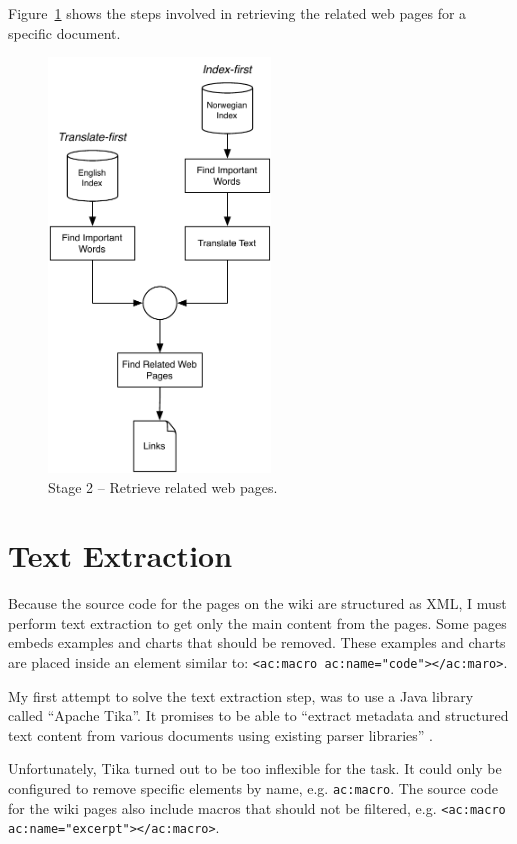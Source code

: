 \documentclass[a4paper]{book}
\begin{document}
Figure~\ref{fig:retrieveRelatedWebPages} shows the steps involved in retrieving the related web pages for a specific document.
\begin{figure}[H]
\centering
\includegraphics[height=11cm]{figs/stage2.pdf}
\caption{Stage 2 -- Retrieve related web pages.}
\label{fig:retrieveRelatedWebPages}
\end{figure}

\section{Text Extraction}
\label{sec:textExtraction}

Because the source code for the pages on the wiki are structured as XML, I must perform text extraction to get only the main content from the pages. Some pages embeds examples and charts that should be removed. These examples and charts are placed inside an element similar to: \verb|<ac:macro ac:name="code"></ac:maro>|.

My first attempt to solve the text extraction step, was to use a Java library called ``Apache Tika''. It promises to be able to ``extract metadata and structured text content from various documents using existing parser libraries'' \cite{aboutTika}.

Unfortunately, Tika turned out to be too inflexible for the task. It could only be configured to remove specific elements by name, e.g. \verb|ac:macro|. The source code for the wiki pages also include macros that should not be filtered, e.g. \verb|<ac:macro ac:name="excerpt"></ac:macro>|.
\end{document}
